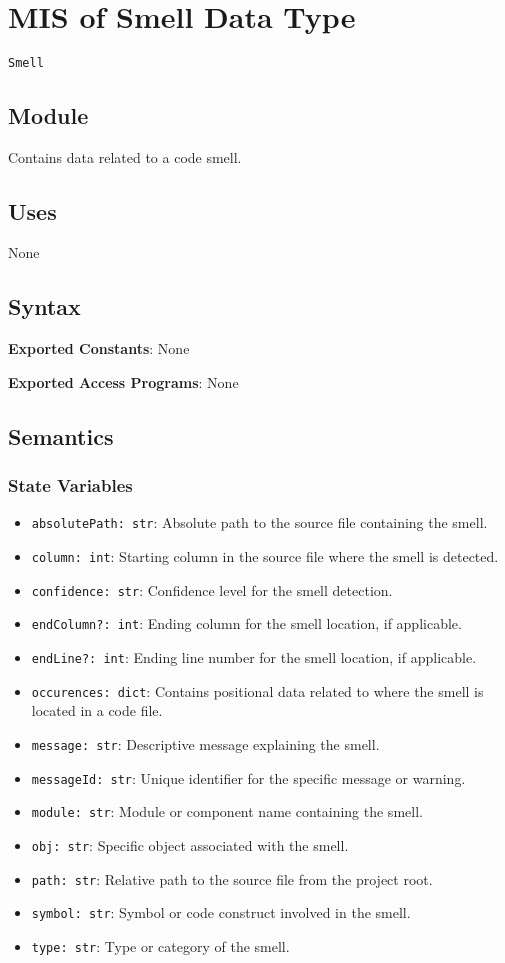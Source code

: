 \documentclass[12pt, titlepage]{article}
\begin{document}
~\newpage

\section{MIS of Smell Data Type} \label{mis:smell}
\texttt{Smell}

\subsection{Module}
Contains data related to a code smell.

\subsection{Uses}
None

\subsection{Syntax}
\noindent
\textbf{Exported Constants}: None

\noindent
\textbf{Exported Access Programs}: None

\subsection{Semantics}

\subsubsection{State Variables}
\begin{itemize}
  \item \texttt{absolutePath: str}: Absolute path to the source file containing the smell.
  \item \texttt{column: int}: Starting column in the source file where the smell is detected.
  \item \texttt{confidence: str}: Confidence level for the smell detection.
  \item \texttt{endColumn?: int}: Ending column for the smell location, if applicable.
  \item \texttt{endLine?: int}: Ending line number for the smell location, if applicable.
  \item \texttt{occurences: dict}: Contains positional data related to where the smell is located in a code file.
  \item \texttt{message: str}: Descriptive message explaining the smell.
  \item \texttt{messageId: str}: Unique identifier for the specific message or warning.
  \item \texttt{module: str}: Module or component name containing the smell.
  \item \texttt{obj: str}: Specific object associated with the smell.
  \item \texttt{path: str}: Relative path to the source file from the project root.
  \item \texttt{symbol: str}: Symbol or code construct involved in the smell.
  \item \texttt{type: str}: Type or category of the smell.
\end{itemize}
\end{document}
